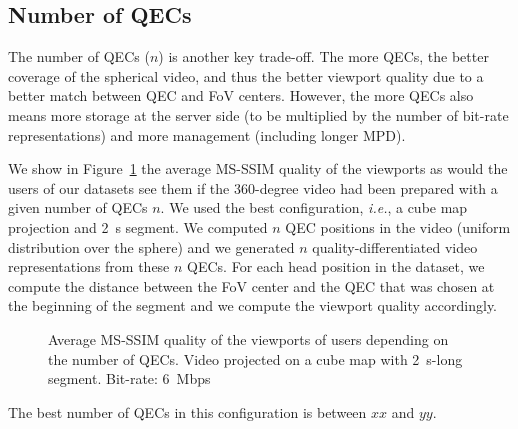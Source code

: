 
\subsection{Number of \acp{QEC}}

The number of QECs ($n$) is another key trade-off. The more QECs, the better coverage
of the spherical video, and thus the better viewport quality due to a better match
between QEC and FoV centers. However, the more QECs also means more storage
at the server side (to be multiplied by the number of bit-rate representations) and
more management (including longer \ac{MPD}).

We show in Figure~\ref{fig:QEC} the average \acs{MS-SSIM} quality of the viewports as
would the users of our datasets see them if the 360-degree video had been prepared
with a given number of QECs $n$. We used the best configuration, \textit{i.e.}, a cube map projection
and \SI{2}{\second} segment. We computed $n$ QEC positions in the video (uniform distribution over the sphere) and we generated $n$ quality-differentiated video representations from these $n$ QECs.
For each head position in the dataset, we compute the distance between the
FoV center and the QEC that was chosen at the beginning of the segment and we compute
the viewport quality accordingly.

\begin{figure}[htbp]
\centering

\caption{Average \acs{MS-SSIM} quality of the viewports of users depending
on the number of QECs. Video projected on a cube map with \SI{2}{\second}-long segment.
Bit-rate: \SI{6}{\mega bps}}
\label{fig:QEC}
\end{figure}

The best number of QECs in this configuration is between $xx$ and $yy$.
